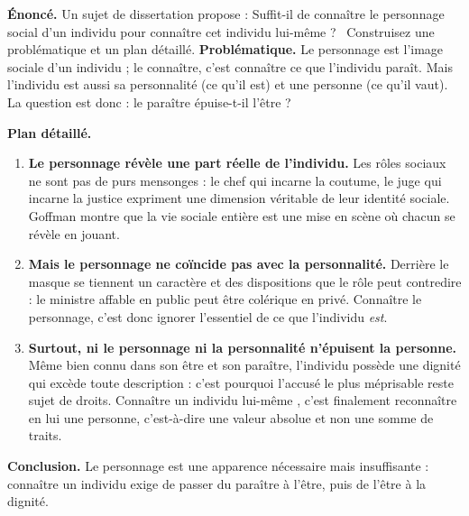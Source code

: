 \documentclass[11pt]{article}
\begin{document}
\begin{exoresolu}
\textbf{Énoncé.} Un sujet de dissertation propose : \guillemotleft Suffit-il de connaître le personnage social d'un individu pour connaître cet individu lui-même ? \guillemotright\ Construisez une problématique et un plan détaillé.
\tcblower
\textbf{Problématique.} Le personnage est l'image sociale d'un individu ; le connaître, c'est connaître ce que l'individu paraît. Mais l'individu est aussi sa personnalité (ce qu'il est) et une personne (ce qu'il vaut). La question est donc : le paraître épuise-t-il l'être ?

\textbf{Plan détaillé.}
\begin{enumerate}
\item \textbf{Le personnage révèle une part réelle de l'individu.} Les rôles sociaux ne sont pas de purs mensonges : le chef qui incarne la coutume, le juge qui incarne la justice expriment une dimension véritable de leur identité sociale. Goffman montre que la vie sociale entière est une mise en scène où chacun se révèle en jouant.
\item \textbf{Mais le personnage ne coïncide pas avec la personnalité.} Derrière le masque se tiennent un caractère et des dispositions que le rôle peut contredire : le ministre affable en public peut être colérique en privé. Connaître le personnage, c'est donc ignorer l'essentiel de ce que l'individu \emph{est}.
\item \textbf{Surtout, ni le personnage ni la personnalité n'épuisent la personne.} Même bien connu dans son être et son paraître, l'individu possède une dignité qui excède toute description : c'est pourquoi l'accusé le plus méprisable reste sujet de droits. Connaître un individu \guillemotleft lui-même \guillemotright, c'est finalement reconnaître en lui une personne, c'est-à-dire une valeur absolue et non une somme de traits.
\end{enumerate}
\textbf{Conclusion.} Le personnage est une apparence nécessaire mais insuffisante : connaître un individu exige de passer du paraître à l'être, puis de l'être à la dignité.
\end{exoresolu}
\end{document}

